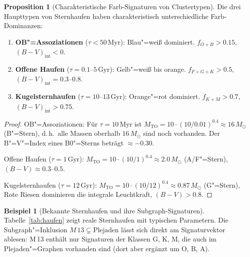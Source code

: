 ﻿\documentclass[a4paper,12pt]{article}
\theoremstyle{definition}
\newtheorem{beispiel}{Beispiel}
\newtheorem{proposition}{Proposition}
\begin{document}
\begin{proposition}[Charakteristische Farb-Signaturen von Clustertypen]
\label{prop:typen}
    Die drei Haupttypen von Sternhaufen haben charakteristisch
    unterschiedliche Farb-Dominanzen:
    \begin{enumerate}
        \item \textbf{OB"=Assoziationen} ($\tau < 50\,\text{Myr}$):
              Blau"=weiß dominiert. $f_{O+B} > 0.15$,
              $(B-V)_{\text{int}} < 0$.
        \item \textbf{Offene Haufen} ($\tau = 0.1$--$5\,\text{Gyr}$):
              Gelb"=weiß bis orange. $f_{F+G+K} > 0.5$,
              $(B-V)_{\text{int}} = 0.3$--$0.8$.
        \item \textbf{Kugelsternhaufen} ($\tau = 10$--$13\,\text{Gyr}$):
              Orange"=rot dominiert. $f_{K+M} > 0.7$,
              $(B-V)_{\text{int}} > 0.75$.
    \end{enumerate}
\end{proposition}

\begin{proof}
    OB"=Assoziationen: Für $\tau = 10\,\text{Myr}$ ist
    $M_{\text{TO}} = 10\cdot(10/0.01)^{0.4} \approx 16\,M_\odot$ (B"=Stern),
    d.\,h.\ alle Massen oberhalb $16\,M_\odot$ sind noch vorhanden.
    Der B"=V"=Index eines B0"=Sterns beträgt $\approx -0.30$.

    Offene Haufen ($\tau = 1\,\text{Gyr}$):
    $M_{\text{TO}} = 10\cdot(10/1)^{0.4} \approx 2.0\,M_\odot$ (A/F"=Stern),
    $(B-V) \approx 0.3$--$0.5$.

    Kugelsternhaufen ($\tau = 12\,\text{Gyr}$):
    $M_{\text{TO}} = 10\cdot(10/12)^{0.4} \approx 0.87\,M_\odot$ (G"=Stern),
    Rote Riesen dominieren die integrale Leuchtkraft, $(B-V) > 0.8$. \qedhere
\end{proof}

\begin{beispiel}[Bekannte Sternhaufen und ihre Subgraph-Signaturen]
    Tabelle~\ref{tab:haufen} zeigt reale Sternhaufen mit typischen
    Parametern. Die Subgraph"=Inklusion $M\,13 \subsetneq \text{Plejaden}$
    lässt sich direkt am Signaturvektor ablesen: M\,13 enthält nur
    Signaturen der Klassen G, K, M, die auch im Plejaden"=Graphen
    vorhanden sind (dort aber ergänzt um O, B, A).
\end{beispiel}
\end{document}
